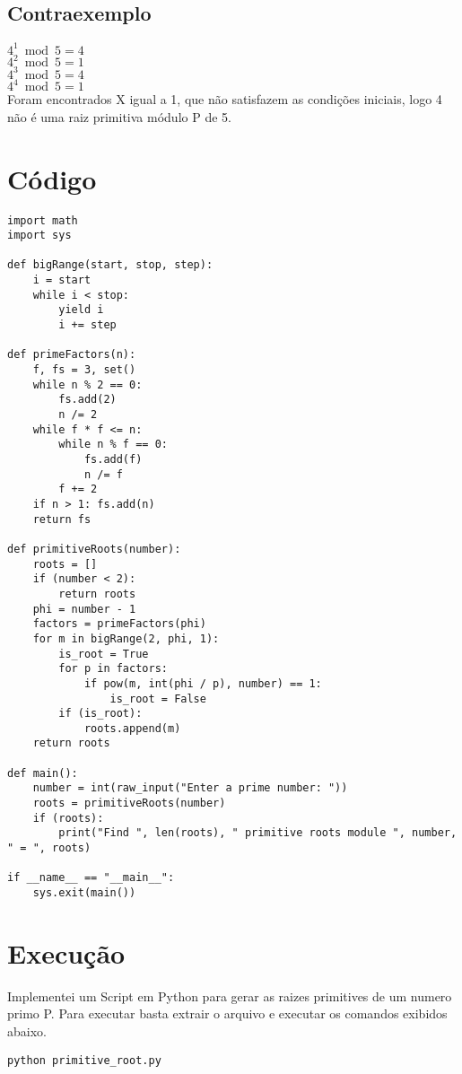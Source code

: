 \documentclass[a4paper,11pt]{article}
\theoremstyle{mytheor}
\begin{document}
\subsection*{Contraexemplo}
$4^1 \bmod 5 = 4$\\
$4^2 \bmod 5 = 1$\\
$4^3 \bmod 5 = 4$\\
$4^4 \bmod 5 = 1$\\

Foram encontrados X igual a 1, que não satisfazem as condições iniciais, logo 4 não é uma raiz primitiva módulo P de 5.
\section*{Código}

\begin{lstlisting}[label={list:first},caption=Encontrando Raiz Primitiva Módulo P em Python.]
import math
import sys

def bigRange(start, stop, step):
    i = start
    while i < stop:
        yield i
        i += step

def primeFactors(n):
    f, fs = 3, set()
    while n % 2 == 0:
        fs.add(2)
        n /= 2
    while f * f <= n:
        while n % f == 0:
            fs.add(f)
            n /= f
        f += 2
    if n > 1: fs.add(n)
    return fs

def primitiveRoots(number):
    roots = []
    if (number < 2):
        return roots
    phi = number - 1
    factors = primeFactors(phi)
    for m in bigRange(2, phi, 1):
        is_root = True
        for p in factors:
            if pow(m, int(phi / p), number) == 1:
                is_root = False
        if (is_root):
            roots.append(m)
    return roots

def main():
    number = int(raw_input("Enter a prime number: "))
    roots = primitiveRoots(number)
    if (roots):
        print("Find ", len(roots), " primitive roots module ", number, " = ", roots)

if __name__ == "__main__":
    sys.exit(main())
\end{lstlisting}

\section*{Execução}
Implementei um Script em Python para gerar as raizes primitives de um numero primo P. Para executar basta extrair o arquivo e executar os comandos exibidos abaixo.

\begin{lstlisting}[label={list:second},caption=Executando o script.]
python primitive_root.py
\end{lstlisting}
\end{document}
